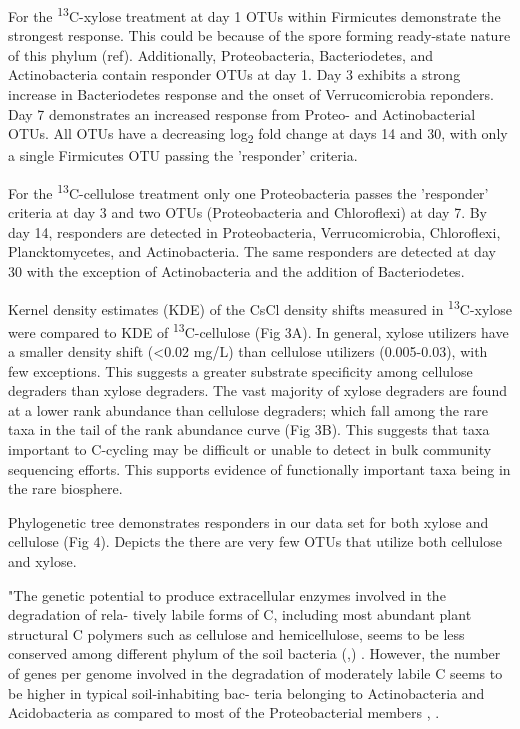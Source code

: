 For the \textsuperscript{13}C-xylose treatment at day 1 OTUs within Firmicutes demonstrate the strongest response. This could be because of the spore forming ready-state nature of this phylum (ref). Additionally, Proteobacteria, Bacteriodetes, and Actinobacteria contain responder OTUs at day 1. Day 3 exhibits a strong increase in Bacteriodetes response and the onset of Verrucomicrobia reponders.  Day 7 demonstrates an increased response from Proteo- and Actinobacterial OTUs.  All OTUs have a decreasing log\textsubscript{2} fold change at days 14 and 30, with only a single Firmicutes OTU passing the 'responder' criteria.     

For the \textsuperscript{13}C-cellulose treatment only one Proteobacteria passes the 'responder' criteria at day 3 and two OTUs (Proteobacteria and Chloroflexi) at day 7.  By day 14, responders are detected in Proteobacteria, Verrucomicrobia, Chloroflexi, Plancktomycetes, and Actinobacteria.  The same responders are detected at day 30 with the exception of Actinobacteria and the addition of Bacteriodetes.    

Kernel density estimates (KDE) of the CsCl density shifts measured in \textsuperscript{13}C-xylose were compared to KDE of \textsuperscript{13}C-cellulose (Fig 3A). In general, xylose utilizers have a smaller density shift (<0.02 mg/L) than cellulose utilizers (0.005-0.03), with few exceptions.  This suggests a greater substrate specificity among cellulose degraders than xylose degraders.  The vast majority of xylose degraders are found at a lower rank abundance than cellulose degraders; which fall among the rare taxa in the tail of the rank abundance curve (Fig 3B). This suggests that taxa important to C-cycling may be difficult or unable to detect in bulk community sequencing efforts. This supports evidence of functionally important taxa being in the rare biosphere. 

Phylogenetic tree demonstrates responders in our data set for both xylose and cellulose (Fig 4).  Depicts the there are very few OTUs that utilize both cellulose and xylose. 

"The genetic potential to produce extracellular enzymes involved in the degradation of rela- tively labile forms of C, including most abundant plant structural C polymers such as cellulose and hemicellulose, seems to be less conserved among different phylum of the soil bacteria (\cite{Zimmerman_2013},\cite{Trivedi_2013}) . However, the number of genes per genome involved in the degradation of moderately labile C seems to be higher in typical soil-inhabiting bac- teria belonging to Actinobacteria and Acidobacteria as compared to most of the Proteobacterial members \cite{Berlemont_2013}, \cite{Trivedi_2013}.

